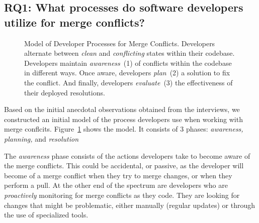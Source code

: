 
\subsection{\textbf{RQ1:} What processes do software developers utilize for merge conflicts?}\label{RQ1}

\begin{figure}[!htbp]
\centering
{}
\caption{Model of Developer Processes for Merge Conflicts. Developers alternate between \textit{clean} and \textit{conflicting} states within their codebase. Developers maintain \textit{awareness}~(1) of conflicts within the codebase in different ways. Once aware, developers \textit{plan}~(2) a solution to fix the conflict. And finally, developers \textit{evaluate}~(3) the effectiveness of their deployed resolutions.}
\label{model}
\end{figure}



Based on the initial anecdotal observations obtained from the interviews, we constructed an initial model of the process developers use when working with merge conflcits.
Figure~\ref{model} shows the model.
It consists of 3 phases: \emph{awareness, planning,} and \emph{resolution}

The \emph{awareness} phase consists of the actions developers take to become aware of the merge conflicts.
This could be accidental, or passive, as the developer will become of a merge conflict when they try to merge changes, or when they perform a pull.
At the other end of the spectrum are developers who are \emph{proactively} monitoring for merge conflicts as they code.
They are looking for changes that might be problematic, either manually (regular updates) or through the use of specialized tools.

